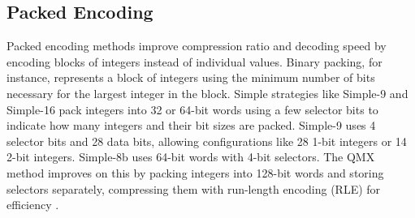 \subsection{Packed Encoding}
Packed encoding methods improve compression ratio and decoding speed by encoding blocks of integers instead of individual values. Binary packing, for instance, represents a block of integers using the minimum number of bits necessary for the largest integer in the block. Simple strategies like Simple-9 and Simple-16 pack integers into 32 or 64-bit words using a few selector bits to indicate how many integers and their bit sizes are packed. Simple-9 uses 4 selector bits and 28 data bits, allowing configurations like 28 1-bit integers or 14 2-bit integers. Simple-8b uses 64-bit words with 4-bit selectors. The QMX method improves on this by packing integers into 128-bit words and storing selectors separately, compressing them with run-length encoding (RLE) for efficiency \cite{Navarro_2016}.



